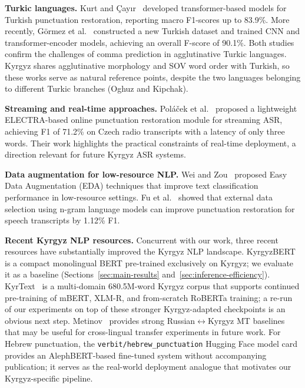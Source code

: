 \documentclass[manuscript, review]{acmart}
\begin{document}
\textbf{Turkic languages.}
Kurt and \c{C}ay{\i}r~\cite{kurt2023turkish} developed transformer-based models for Turkish punctuation restoration, reporting macro F1-scores up to 83.9\%. More recently, G\"{o}rmez et al.~\cite{gormez2025turkish} constructed a new Turkish dataset and trained CNN and transformer-encoder models, achieving an overall F-score of 90.1\%. Both studies confirm the challenges of comma prediction in agglutinative Turkic languages. Kyrgyz shares agglutinative morphology and SOV word order with Turkish, so these works serve as natural reference points, despite the two languages belonging to different Turkic branches (Oghuz and Kipchak).

\textbf{Streaming and real-time approaches.}
Pol\'{a}\v{c}ek et al.~\cite{polacek2023streaming} proposed a lightweight ELECTRA-based online punctuation restoration module for streaming ASR, achieving F1 of 71.2\% on Czech radio transcripts with a latency of only three words. Their work highlights the practical constraints of real-time deployment, a direction relevant for future Kyrgyz ASR systems.

\textbf{Data augmentation for low-resource NLP.}
Wei and Zou~\cite{wei2019eda} proposed Easy Data Augmentation (EDA) techniques that improve text classification performance in low-resource settings. Fu et al.~\cite{fu2021improving} showed that external data selection using n-gram language models can improve punctuation restoration for speech transcripts by 1.12\% F1.

\textbf{Recent Kyrgyz NLP resources.}
Concurrent with our work, three recent resources have substantially improved the Kyrgyz NLP landscape. KyrgyzBERT~\cite{metinov2025kyrgyzbert} is a compact monolingual BERT pre-trained exclusively on Kyrgyz; we evaluate it as a baseline (Sections~\ref{sec:main-results} and~\ref{sec:inference-efficiency}). KyrText~\cite{chubakov2026kyrtext} is a multi-domain 680.5M-word Kyrgyz corpus that supports continued pre-training of mBERT, XLM-R, and from-scratch RoBERTa training; a re-run of our experiments on top of these stronger Kyrgyz-adapted checkpoints is an obvious next step. Metinov~\cite{metinov2026russiankyrgyz} provides strong Russian$\leftrightarrow$Kyrgyz MT baselines that may be useful for cross-lingual transfer experiments in future work. For Hebrew punctuation, the \texttt{verbit/hebrew\_punctuation} Hugging Face model card provides an AlephBERT-based fine-tuned system without accompanying publication; it serves as the real-world deployment analogue that motivates our Kyrgyz-specific pipeline.
\end{document}
